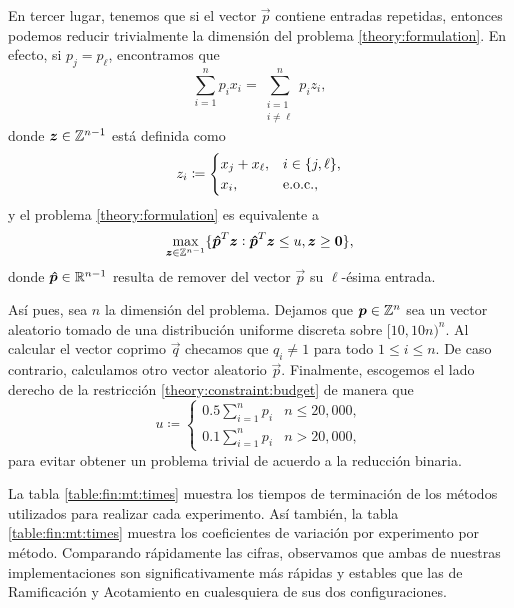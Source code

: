 En tercer lugar, tenemos que si el vector $\vec{p}$ contiene entradas repetidas, entonces podemos
reducir trivialmente la dimensión del problema \eqref{theory:formulation}. En efecto, si $p_j =
p_\ell$, encontramos que
\begin{equation*}
	\sum_{i = 1}^{n}p_ix_i = \sum_{\substack{i = 1 \\ i \neq \ell}}^{n}p_iz_i,
\end{equation*}
donde $\boldsymbol{z} \in \mathbb{Z}^{n-1}$ está definida como
\begin{equation*}
	z_i \coloneq \begin{cases}
		x_j + x_\ell, & i \in \lbrace j, \ell \rbrace, \\
		x_i, & \text{e.o.c.},
	\end{cases}
\end{equation*}
y el problema \eqref{theory:formulation} es equivalente a
\begin{equation*}
	\max_{\boldsymbol{z} \in \mathbb{Z}^{n-1}} \lbrace \boldsymbol{\hat{p}}^T\boldsymbol{z} \vcentcolon \boldsymbol{\hat{p}}^T\boldsymbol{z} \leq u,
	\boldsymbol{z} \geq \boldsymbol{0} \rbrace,
\end{equation*}
donde $\boldsymbol{\hat{p}} \in \mathbb{R}^{n-1}$ resulta de remover del vector $\vec{p}$ su $\ell$-ésima entrada.

Así pues, sea $n$ la dimensión del problema. Dejamos que $\boldsymbol{p} \in \mathbb{Z}^n$ sea un vector aleatorio
tomado de una distribución uniforme discreta sobre $[10, 10n)^n$. Al calcular el vector coprimo
$\vec{q}$ checamos que $q_i \neq 1$ para todo $1 \leq i \leq n$. De caso contrario, calculamos otro
vector aleatorio $\vec{p}$. Finalmente, escogemos el lado derecho de la restricción
\eqref{theory:constraint:budget} de manera que
\begin{equation*}
	u \coloneq \begin{cases}
		0.5\sum_{i=1}^{n}p_i & n \leq 20,000, \\
		0.1\sum_{i=1}^{n}p_i & n > 20,000,
	\end{cases}
\end{equation*}
para evitar obtener un problema trivial de acuerdo a la reducción binaria.

La tabla \ref{table:fin:mt:times} muestra los tiempos de terminación de los métodos utilizados para
realizar cada experimento. Así también, la tabla \ref{table:fin:mt:times} muestra los coeficientes
de variación por experimento por método. Comparando rápidamente las cifras, observamos que ambas de
nuestras implementaciones son significativamente más rápidas y estables que las de Ramificación y
Acotamiento en cualesquiera de sus dos configuraciones.

